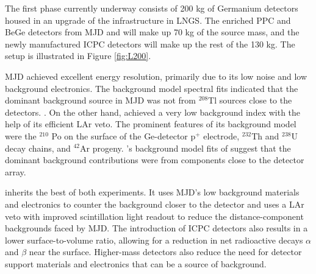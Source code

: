 The first phase currently underway consists of 200 kg of Germanium detectors housed in an upgrade of the {\Gerda} infrastructure in LNGS. The enriched PPC and BeGe detectors from MJD and {\Gerda} will make up 70 kg of the source mass, and the newly manufactured ICPC detectors will make up the rest of the 130 kg. The setup is illustrated in Figure \ref{fig:L200}. 

MJD achieved excellent energy resolution, primarily due to its low noise and low background electronics. The background model spectral fits indicated that the dominant background source in MJD was not from $^{208}$Tl sources close to the detectors. \cite{Buuck_thesis}. On the other hand, {\Gerda} achieved a very low background index with the help of its efficient LAr veto. The prominent features of its background model were the $^{210}$ Po on the surface of the Ge-detector p$^+$ electrode, $^{232}$Th and $^{238}$U decay chains, and $^{42}$Ar progeny. {\Gerda}'s background model fits of {\Gerda } suggest that the dominant background contributions \cite{GERDA_final} were from components close to the detector array.

{\Ltwo} inherits the best of both experiments. It uses MJD's low background materials and electronics to counter the background {\Gerda} closer to the detector and uses a LAr veto with improved scintillation light readout to reduce the distance-component backgrounds faced by MJD. The introduction of ICPC detectors also results in a lower surface-to-volume ratio, allowing for a reduction in net radioactive decays $\alpha$ and $\beta$ near the surface. Higher-mass detectors also reduce the need for detector support materials and electronics that can be a source of background. 

